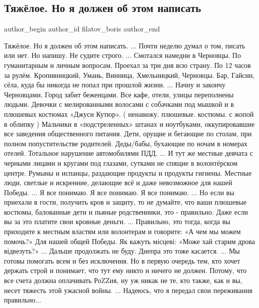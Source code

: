  
 
 
 
 
 
\subsection{Тяжёлое. Но я должен об этом написать}
\label{sec:23_04_2022.fb.filatov_boris.1.tjazheloje}
 
\ifcmt
 author_begin
   author_id filatov_boris
 author_end
\fi

\obeycr
Тяжёлое.
Но я должен об этом написать.
...
Почти неделю думал о том, писать или нет.
Но напишу.
Не судите строго.
...
Смотался намедни в Черновцы. По гуманитарным и личным вопросам.
Проехал за три дня всю страну. 
По 12 часов за рулём.
Кропивницкий, Умань, Винница, Хмельницкий, Черновцы.
Бар, Гайсин, сёла, куда бы никогда не попал при прошлой жизни.
...
Начну и закончу Черновцами.
Город забит беженцами.
Все кафе, отели, улицы переполнены людьми.
Девочки с мелированными волосами с собачками под мышкой и в плюшевых костюмах «Джуси Кутюр». 
( ненавижу. плюшевые. костюмы. с жопой в облипку )
Мальчики в «подстреленных» штанах и ноутбуками, оккупировавшие все заведения общественного питания.
Дети, орущие и бегающие по столам, при полном попустительстве родителей.
Деды/бабы, бухающие по ночам в номерах отелей.
Тотальное нарушение автомобилями  ПДД.
...
И тут же местные девчата с черными лицами и кругами под глазами, сутками не спящие в волонтёрском центре.
Румыны и испанцы, раздающие продукты и продукты гигиены.
Местные люди, светлые и искренние, делающие всё и даже невозможное для нашей Победы.
...
Я все понимаю.
Я все понимаю.
Я все понимаю.
...
Но если вы приехали в гости, получить кров и защиту, то не думайте, что ваши плюшевые костюмы, балованные дети и пьяные родственники, это - правильно.
Даже если вы за это платите свои кровные деньги.
...
Правильно, это тогда, когда вы приходите к местным властям или волонтерам и говорите: «А чем мы можем помочь?»
Для нашей общей Победы.
Як кажуть місцеві: «Може хай старим дрова відвезуть?»
...
Дальше продолжать не буду.
Днепра это тоже касается.
...
Мы готовы помогать всем и без исключения.
Но в первую очередь тем, кто хочет держать строй и понимает, что тут ему никто и ничего не должен.
Потому, что все счета должна оплачивать РоZZия, ну уж никак не те, кто также, как и вы, несет тяжесть этой ужасной войны.
...
Надеюсь, что я передал свои переживания правильно...
\restorecr
